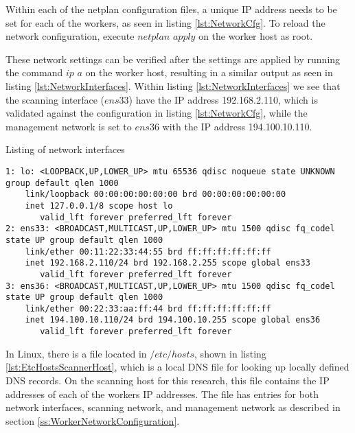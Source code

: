 Within each of the netplan configuration files, a unique IP address needs to be set for each of the workers, as seen in listing \ref{lst:NetworkCfg}.
To reload the network configuration, execute $netplan$ $apply$ on the worker host as root.

These network settings can be verified after the settings are applied by running the command $ip$ $a$ on the worker host, resulting in a similar output as seen in listing \ref{lst:NetworkInterfaces}.
Within listing \ref{lst:NetworkInterfaces} we see that the scanning interface ($ens33$) have the IP address 192.168.2.110, which is validated against the configuration in listing \ref{lst:NetworkCfg}, while the management network is set to $ens36$ with the IP address 194.100.10.110.


\begin{listing}[!ht]
\caption{Listing of network interfaces}
\label{lst:NetworkInterfaces}
\begin{verbatim}
1: lo: <LOOPBACK,UP,LOWER_UP> mtu 65536 qdisc noqueue state UNKNOWN group default qlen 1000
    link/loopback 00:00:00:00:00:00 brd 00:00:00:00:00:00
    inet 127.0.0.1/8 scope host lo
       valid_lft forever preferred_lft forever
2: ens33: <BROADCAST,MULTICAST,UP,LOWER_UP> mtu 1500 qdisc fq_codel state UP group default qlen 1000
    link/ether 00:11:22:33:44:55 brd ff:ff:ff:ff:ff:ff
    inet 192.168.2.110/24 brd 192.168.2.255 scope global ens33
       valid_lft forever preferred_lft forever
3: ens36: <BROADCAST,MULTICAST,UP,LOWER_UP> mtu 1500 qdisc fq_codel state UP group default qlen 1000
    link/ether 00:22:33:aa:ff:44 brd ff:ff:ff:ff:ff:ff
    inet 194.100.10.110/24 brd 194.100.10.255 scope global ens36
       valid_lft forever preferred_lft forever
\end{verbatim}
\end{listing}

In Linux, there is a file located in $/etc/hosts$, shown in listing \ref{lst:EtcHostsScannerHost}, which is a local DNS file for looking up locally defined DNS records.
On the scanning host for this research, this file contains the IP addresses of each of the workers IP addresses.
The file has entries for both network interfaces, scanning network, and management network as described in section \ref{ss:WorkerNetworkConfiguration}.

